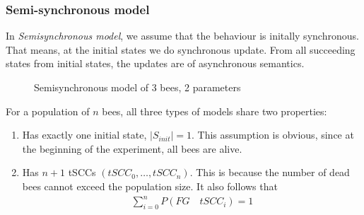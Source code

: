 \documentclass[12pt]{article}
\theoremstyle{definition}
\newcommand*{\oh}{\frac{1}{2}}
\begin{document}
\subsubsection{Semi-synchronous model}
In \textit{Semisynchronous model}, we assume that the behaviour is initally
synchronous. That means, at the initial states we do synchronous update. From
all succeeding states from initial states, the updates are of asynchronous semantics.
\begin{figure}[H]
  \centering 
  \caption{Semisynchronous model of 3 bees, 2 parameters}
\end{figure}

For a population of $n$ bees, all three types of models share two properties:
\begin{enumerate}
\item Has exactly one initial state, $|S_{init}| = 1$. This assumption is
  obvious, since at the beginning of the experiment, all bees are alive.
\item Has $n+1$ tSCCs $(tSCC_0,\ldots,tSCC_n)$. This is because the number of
  dead bees cannot exceed the population size. It also follows that
  \begin{align*}
    \sum_{i=0}^n P(FG\quad tSCC_i) = 1
  \end{align*}
\end{enumerate}
\end{document}
